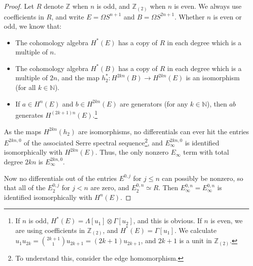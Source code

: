 \documentclass{article}
\newcommand{\N}{\mathbb{N}}
\newcommand{\Z}{\mathbb{Z}}
\begin{document}
\begin{proof}
Let $R$ denote $\Z$ when $n$ is odd, and $\Z_{(2)}$ when $n$ is even. We always use coefficients in $R$, and write $E=\Omega S^{n+1}$ and $B=\Omega S^{2n+1}$. Whether $n$ is even or odd, we know that:
\begin{itemize}
\item The cohomology algebra $H^*(E)$ has a copy of $R$ in each degree which is a multiple of $n$.
\item The cohomology algebra $H^*(B)$ has a copy of $R$ in each degree which is a multiple of $2n$, and the map $h_2^*:H^{2kn}(B)\to H^{2kn}(E)$ is an isomorphism (for all $k\in\N$).
\item If $a\in H^{n}(E)$ and $b\in H^{2kn}(E)$ are generators (for any $k\in\N$), then $ab$ generates $H^{(2k+1)n}(E)$.\footnote{If $n$ is odd, $H^*(E)=\Lambda[u_1]\otimes \Gamma[u_2]$, and this is obvious. If $n$ is even, we are using coefficients in $\Z_{(2)}$, and $H^*(E)=\Gamma[u_1]$. We calculate $u_1u_{2k}=\binom{2k+1}{1}u_{2k+1}=(2k+1)u_{2k+1}$, and $2k+1$ is a unit in $\Z_{(2)}$.}
\end{itemize}

As the maps $H^{2kn}(h_2)$ are isomorphisms, no differentials can ever hit the entries $E^{2kn,0}$ of the associated Serre spectral sequence\footnote{To understand this, consider the edge homomorphism.}, and $E^{2kn,0}_\infty$ is identified isomorphically with $H^{2kn}(E)$.
Thus, the only nonzero $E_\infty$ term with total degree $2kn$ is $E_\infty^{2kn,0}$.

Now no differentials out of the entries $E^{0,j}$ for $j\leq n$ can possibly be nonzero, so that all of the $E_2^{0,j}$ for $j<n$ are zero, and $E_2^{0,n}\simeq R$. Then $E_\infty^{0,n}=E_\infty^{0,n}$ is identified isomorphically with $H^n(E)$.


\end{proof}
\end{document}
